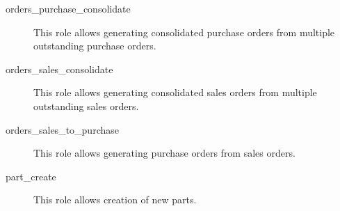 \begin{description}
\item [orders\_purchase\_consolidate] \htmlspacing 
                         This role allows generating consolidated purchase
                         orders from multiple outstanding purchase orders.
\item [orders\_sales\_consolidate] \htmlspacing 
                         This role allows generating consolidated sales
                         orders from multiple outstanding sales orders.
\item [orders\_sales\_to\_purchase] \htmlspacing 
                         This role allows generating purchase orders
                         from sales orders.
\item [part\_create] \htmlspacing 
                         This role allows creation of new parts.


\end{description}
